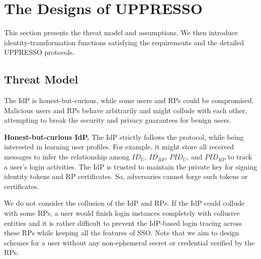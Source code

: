 
\section{The Designs of UPPRESSO}
\label{sec:UPPRESSO}

This section presents the threat model and assumptions.
We then introduce identity-transformation functions satisfying the requirements
    and the detailed UPPRESSO protocols.


\subsection{Threat Model}
The IdP is honest-but-curious,
 while some users and RPs could be compromised. %
Malicious users and RPs behave arbitrarily and might collude with each other,
 attempting to break the security and privacy guarantees for benign users.


\vspace{0.5mm}
\noindent \textbf{Honest-but-curious IdP.}
The IdP strictly follows the protocol, while being interested in learning user profiles.  %
For example, it might store all received messages
 to infer the relationship among $ID_U$, $ID_{RP}$, $PID_{U}$, and $PID_{RP}$ to track a user's login activities.
The IdP is trusted to maintain the private key for signing identity tokens and RP certificates. %
So, adversaries cannot forge such tokens or certificates.

We do not consider the collusion of the IdP and RPs.
    If the IdP could collude with some RPs,
        a user would finish login instances completely with collusive entities
        and it is rather difficult to prevent the IdP-based login tracing across these RPs
            while keeping all the features of SSO.
Note that we aim to design schemes for a user without any non-ephemeral secret or credential verified by the RPs.

